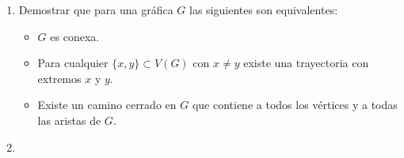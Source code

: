 \documentclass[10pt]{report}
\numberwithin{section}{chapter}
\begin{document}
\begin{enumerate}
\item Demostrar que para una gráfica $G$ las siguientes son equivalentes:
\begin{itemize}
\item $G$ es conexa.
\item Para cualquier $\{x,y\} \subset V(G)$ con $x \neq y$ existe una trayectoria con extremos $x$ y $y$.
\item Existe un camino cerrado en $G$ que contiene a todos los vértices y a todas las aristas de $G$.
\end{itemize}

\item 

\end{enumerate}
\end{document}
